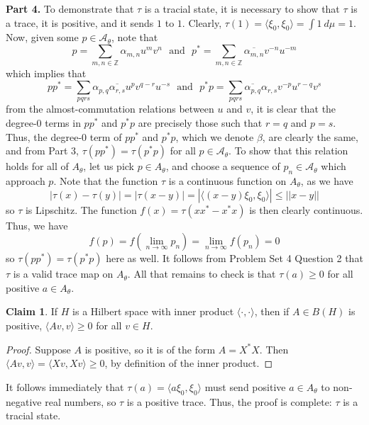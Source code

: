 \documentclass[aps,pra,showpacs,notitlepage,onecolumn,superscriptaddress,nofootinbib]{revtex4-1}
\theoremstyle{definition}
\newtheorem{claim}{Claim}[section]
\begin{document}
    \noindent \textbf{Part 4.} To demonstrate that $\tau$ is a tracial state, it is necessary to show that $\tau$ is a trace, it is positive, and it sends $1$ to $1$. Clearly, $\tau(1) = \langle \xi_0, \xi_0 \rangle = \int 1 \ d \mu = 1$.
    Now, given some $p \in \mathcal{A}_{\theta}$, note that
    \begin{equation}
      p = \displaystyle\sum_{m, n \in \mathbb{Z}} \alpha_{m, n} u^{m} v^{n} \ \ \ \text{and} \ \ \ p^{*} = \displaystyle\sum_{m, n \in \mathbb{Z}} \overline{\alpha_{m, n}} v^{-n} u^{-m}
    \end{equation}
    which implies that
    \begin{equation}
      pp^{*} = \displaystyle\sum_{pqrs} \alpha_{p, q} \overline{\alpha_{r, s}} u^{p} v^{q - r} u^{-s} \ \ \ \text{and} \ \ \ p^{*}p = \displaystyle\sum_{pqrs} \overline{\alpha_{p, q}} \alpha_{r, s} v^{-p} u^{r - q} v^{s}
      \end{equation}
    from the almost-commutation relations between $u$ and $v$, it is clear that the degree-$0$ terms in $pp^{*}$ and $p^{*} p$ are precisely those such that $r = q$ and $p = s$. Thus, the degree-$0$ term of $pp^{*}$ and $p^{*} p$,
    which we denote $\beta$,
    are clearly the same, and from Part 3, $\tau(p p^{*}) = \tau(p^{*} p)$ for all $p \in \mathcal{A}_{\theta}$.
    To show that this relation holds for all of $A_{\theta}$, let us pick $p \in A_{\theta}$, and
    choose a sequence of $p_n \in \mathcal{A}_{\theta}$ which approach $p$.  Note that the function $\tau$ is a continuous function on $A_{\theta}$, as we have
    \begin{equation}
      | \tau(x) - \tau(y) | = |\tau(x - y)| = | \langle (x - y) \xi_0, \xi_0 \rangle | \leq ||x - y||
    \end{equation}
    so $\tau$ is Lipschitz. The function $f(x) = \tau(x x^{*} - x^{*} x)$ is then clearly continuous. Thus, we have
    \begin{equation}
      f(p) = f \left( \lim_{n \to \infty} p_n \right) = \lim_{n \to \infty} f(p_n) = 0
    \end{equation}
    so $\tau(p p^{*}) = \tau(p^{*} p)$ here as well. It follows from Problem Set 4 Question 2 that $\tau$ is a valid trace map on $A_{\theta}$. All that remains to check is that $\tau(a) \geq 0$ for all positive $a \in A_{\theta}$.

    \begin{claim}
      If $H$ is a Hilbert space with inner product $\langle \cdot, \cdot \rangle$, then if $A \in B(H)$ is positive, $\langle Av, v \rangle \geq 0$ for all $v \in H$.
    \end{claim}
    \begin{proof}
      Suppose $A$ is positive, so it is of the form $A = X^{*} X$. Then $\langle Av, v \rangle = \langle X v, X v \rangle \geq 0$, by definition of the inner product.
    \end{proof}
    \noindent It follows immediately that $\tau(a) = \langle a \xi_0, \xi_0\rangle$ must send positive $a \in A_{\theta}$ to non-negative real numbers, so $\tau$ is a positive trace. Thus, the proof
    is complete: $\tau$ is a tracial state.
    \newline
\end{document}
